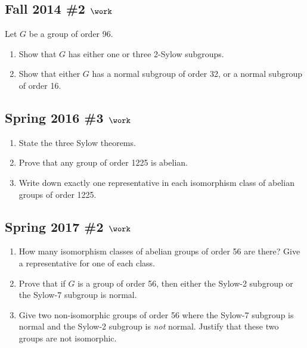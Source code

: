 \hypertarget{fall-2014-2-work}{%
\subsection{\texorpdfstring{Fall 2014 \#2
\(\work\)}{Fall 2014 \#2 \textbackslash work}}\label{fall-2014-2-work}}

Let \(G\) be a group of order 96.

\begin{enumerate}
\def\labelenumi{\alph{enumi}.}
\item
  Show that \(G\) has either one or three 2-Sylow subgroups.
\item
  Show that either \(G\) has a normal subgroup of order 32, or a normal
  subgroup of order 16.
\end{enumerate}

\hypertarget{spring-2016-3-work}{%
\subsection{\texorpdfstring{Spring 2016 \#3
\(\work\)}{Spring 2016 \#3 \textbackslash work}}\label{spring-2016-3-work}}

\begin{enumerate}
\def\labelenumi{\alph{enumi}.}
\item
  State the three Sylow theorems.
\item
  Prove that any group of order 1225 is abelian.
\item
  Write down exactly one representative in each isomorphism class of
  abelian groups of order 1225.
\end{enumerate}

\hypertarget{spring-2017-2-work}{%
\subsection{\texorpdfstring{Spring 2017 \#2
\(\work\)}{Spring 2017 \#2 \textbackslash work}}\label{spring-2017-2-work}}

\begin{enumerate}
\def\labelenumi{\alph{enumi}.}
\item
  How many isomorphism classes of abelian groups of order 56 are there?
  Give a representative for one of each class.
\item
  Prove that if \(G\) is a group of order 56, then either the Sylow-2
  subgroup or the Sylow-7 subgroup is normal.
\item
  Give two non-isomorphic groups of order 56 where the Sylow-7 subgroup
  is normal and the Sylow-2 subgroup is \emph{not} normal. Justify that
  these two groups are not isomorphic.
\end{enumerate}

